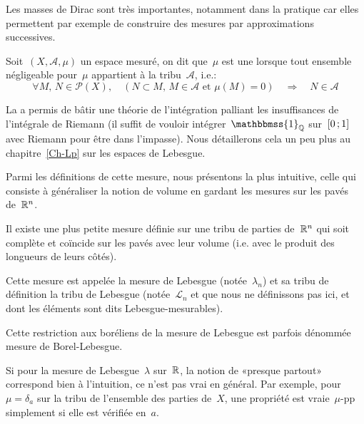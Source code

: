 Les masses de Dirac sont très importantes, notamment dans la pratique car elles permettent par exemple de construire des mesures par approximations successives.


\begin{definition}
Soit~$(X,\mathcal{A},\mu)$ un espace mesuré, on dit que~$\mu$ est une  lorsque tout ensemble négligeable pour~$\mu$ appartient à la tribu~$\mathcal{A}$, i.e.:
\begin{equation}
\forall M,\, N\in\mathcal{P}(X),\quad \left(N\subset M,\, M\in\mathcal{A} \text{ et } \mu(M)=0\right)\quad\Rightarrow\quad N\in\mathcal{A}
\end{equation}
\end{definition}

\medskip
La  a permis de bâtir une théorie de l'intégration palliant les insuffisances de l'intégrale de Riemann (il suffit de vouloir intégrer~$\mathbbmss{1}_{\QQ}$ sur~$\mathopen{[}0\,;1\mathclose{]}$ avec Riemann pour être dans l'impasse).
Nous détaillerons cela un peu plus au chapitre~\ref{Ch-Lp} sur les espaces de Lebesgue.\label{Sec-impasse}

Parmi les définitions de cette mesure, nous présentons la plus intuitive, celle qui consiste à généraliser la notion de volume en gardant les mesures sur les pavés de~$\mathbb R^n$.

\begin{definition}
Il existe une plus petite mesure définie sur une tribu de parties de~$\mathbb R^n$ qui soit complète et coïncide sur les pavés avec leur volume (i.e. avec le produit des longueurs de leurs côtés).

Cette mesure est appelée la mesure de Lebesgue (notée~$\lambda_n$) et sa tribu de définition la tribu de Lebesgue (notée~$\mathcal L_n$ et que nous ne définissons pas ici, et dont les éléments sont dits Lebesgue-mesurables).
\end{definition}

Cette restriction aux boréliens de la mesure de Lebesgue est parfois dénommée mesure de Borel-Lebesgue.

\medskip
Si pour la mesure de Lebesgue~$\lambda$ sur~$\mathbb R$, la notion de «presque partout» correspond bien à l'intuition, ce n'est pas vrai en général.
Par exemple, pour~$\mu=\delta_a$ sur la tribu de l'ensemble des parties de~$X$, une propriété est vraie~$\mu$-pp simplement si elle est vérifiée en~$a$.

